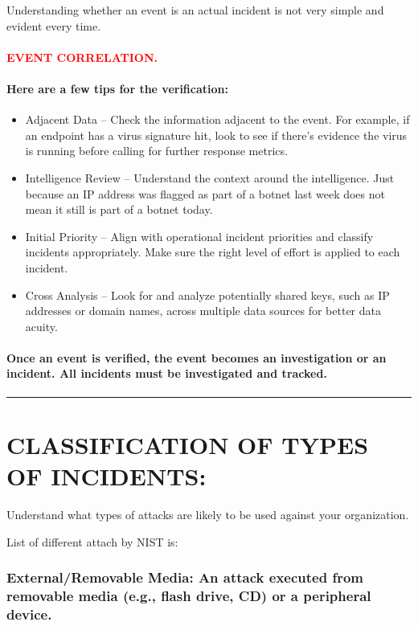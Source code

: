 \documentclass[10pt,british,english]{article}
\begin{document}
Understanding whether an event is an actual incident is not very simple
and evident every time. 

\paragraph{\textcolor{red}{EVENT CORRELATION. }}

\paragraph*{Here are a few tips for the verification:}
\begin{itemize}
\item Adjacent Data -- Check the information adjacent to the event. For
example, if an endpoint has a virus signature hit, look to see if
there\textquoteright s evidence the virus is running before calling
for further response metrics.
\item Intelligence Review -- Understand the context around the intelligence.
Just because an IP address was flagged as part of a botnet last week
does not mean it still is part of a botnet today.
\item Initial Priority -- Align with operational incident priorities and
classify incidents appropriately. Make sure the right level of effort
is applied to each incident.
\item Cross Analysis -- Look for and analyze potentially shared keys, such
as IP addresses or domain names, across multiple data sources for
better data acuity.
\end{itemize}

\paragraph{Once an event is verified, the event becomes an investigation or
an incident. All incidents must be investigated and tracked.}

\rule[0.5ex]{1\columnwidth}{1pt}

\section{CLASSIFICATION OF TYPES OF INCIDENTS:}

Understand what types of attacks are likely to be used against your
organization. 

List of different attach by NIST is:

\subsubsection{External/Removable Media: An attack executed from removable media
(e.g., flash drive, CD) or a peripheral device.}
\end{document}
